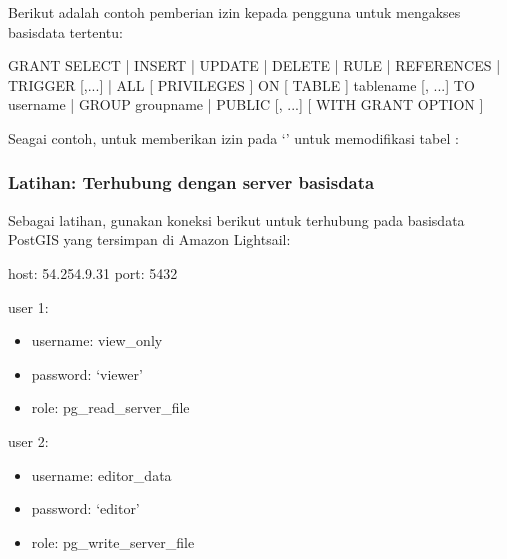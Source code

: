 \documentclass[letterpaper,10pt,english]{sphinxmanual}
\begin{document}

Berikut adalah contoh pemberian izin kepada pengguna untuk mengakses basisdata tertentu:

\begin{sphinxVerbatim}[commandchars=\\\{\}]
GRANT \PYGZob{} \PYGZob{} SELECT | INSERT | UPDATE | DELETE | RULE | REFERENCES | TRIGGER \PYGZcb{}
    [,...] | ALL [ PRIVILEGES ] \PYGZcb{}
    ON [ TABLE ] tablename [, ...]
    TO \PYGZob{} username | GROUP groupname | PUBLIC \PYGZcb{} [, ...] [ WITH GRANT OPTION ]
\end{sphinxVerbatim}

Seagai contoh, untuk memberikan izin pada ‘’ untuk memodifikasi tabel :

\begin{sphinxVerbatim}[commandchars=\\\{\}]
        
\end{sphinxVerbatim}


\subsubsection{Latihan: Terhubung dengan server basisdata}
\label{\detokenize{sesi2/dbmanagement:latihan-terhubung-dengan-server-basisdata}}
Sebagai latihan, gunakan koneksi berikut untuk terhubung pada basisdata PostGIS yang tersimpan di Amazon Lightsail:

host: 54.254.9.31
port: 5432

user 1:
\begin{itemize}
\item {} 
username: view\_only

\item {} 
password: ‘viewer’

\item {} 
role: pg\_read\_server\_file

\end{itemize}

user 2:
\begin{itemize}
\item {} 
username: editor\_data

\item {} 
password: ‘editor’

\item {} 
role: pg\_write\_server\_file

\end{itemize}
\end{document}
